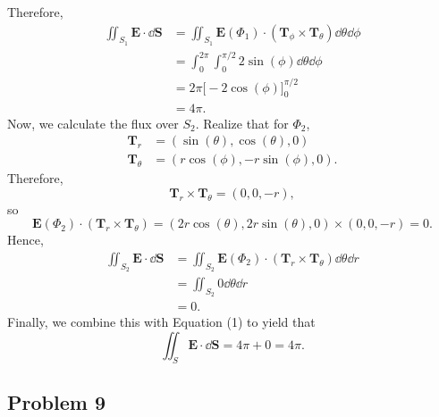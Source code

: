 \documentclass[11pt]{article}
\renewcommand{\vec}[1]{\mathbf{#1}}
\begin{document}
Therefore,
\begin{align*}
	\iint_{S_{1}} \mathbf{E} \cdot \dd{\vec{S}} &= \iint_{S_{1}} \mathbf{E}(\Phi_{1}) \cdot (\mathbf{T}_{\phi} \times \mathbf{T}_{\theta}) \dd{\theta} \dd{\phi} \\
	&= \int_{0}^{2\pi} \int_{0}^{\pi/2} 2\sin(\phi) \dd{\theta} \dd{\phi} \\
	&= 2\pi \Big[ -2\cos(\phi) \Big]_{0}^{\pi/2} \\
	&= 4\pi.
\end{align*}
Now, we calculate the flux over $S_{2}$. Realize that for $\Phi_{2}$,
\begin{align*}
	\mathbf{T}_{r} &= (\sin(\theta), \cos(\theta), 0) \\
	\mathbf{T}_{\theta} &= (r\cos(\phi), -r\sin(\phi), 0).
\end{align*}
Therefore,
\[
	\mathbf{T}_{r} \times \mathbf{T}_{\theta} = (0, 0, -r),
\]
so
\[
	\mathbf{E}(\Phi_{2}) \cdot (\mathbf{T}_{r} \times \mathbf{T}_{\theta}) = (2r\cos(\theta), 2r\sin(\theta), 0) \times (0, 0, -r) = 0.
\]
Hence,
\begin{align*}
	\iint_{S_{2}} \mathbf{E} \cdot \dd{\vec{S}}  &= \iint_{S_{2}} \mathbf{E}(\Phi_{2}) \cdot (\mathbf{T}_{r} \times \mathbf{T}_{\theta}) \dd{\theta} \dd{r} \\
	&= \iint_{S_{2}} 0 \dd{\theta} \dd{r} \\
	&= 0.
\end{align*}
Finally, we combine this with Equation (1) to yield that
\[
	\iint_{S} \mathbf{E} \cdot \dd{\vec{S}} = 4\pi + 0 = \boxed{4\pi}.
\]

\subsection*{Problem 9}
\end{document}
